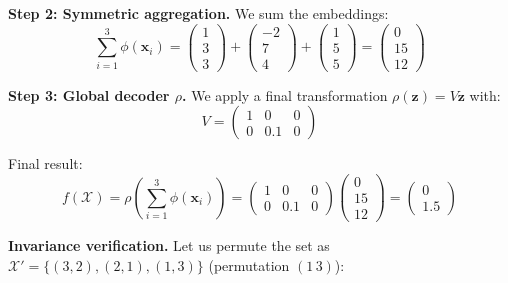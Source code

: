 \begin{example}
\textbf{Step 2: Symmetric aggregation.} We sum the embeddings:
\begin{equation}
\sum_{i=1}^3 \phi(\mathbf{x}_i) = \begin{pmatrix} 1 \\ 3 \\ 3 \end{pmatrix} + \begin{pmatrix} -2 \\ 7 \\ 4 \end{pmatrix} + \begin{pmatrix} 1 \\ 5 \\ 5 \end{pmatrix} = \begin{pmatrix} 0 \\ 15 \\ 12 \end{pmatrix}
\end{equation}

\textbf{Step 3: Global decoder $\rho$.} We apply a final transformation $\rho(\mathbf{z}) = V\mathbf{z}$ with:
\begin{equation}
V = \begin{pmatrix} 1 & 0 & 0 \\ 0 & 0.1 & 0 \end{pmatrix}
\end{equation}

Final result:
\begin{equation}
f(\mathcal{X}) = \rho\left(\sum_{i=1}^3 \phi(\mathbf{x}_i)\right) = \begin{pmatrix} 1 & 0 & 0 \\ 0 & 0.1 & 0 \end{pmatrix} \begin{pmatrix} 0 \\ 15 \\ 12 \end{pmatrix} = \begin{pmatrix} 0 \\ 1.5 \end{pmatrix}
\end{equation}

\textbf{Invariance verification.} Let us permute the set as $\mathcal{X}' = \{(3,2), (2,1), (1,3)\}$ (permutation $(1\,3)$):


\end{example}
